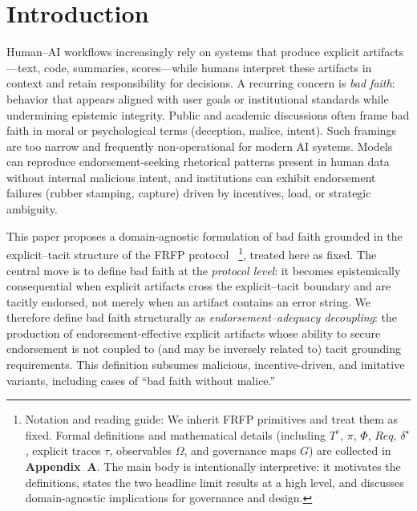 \documentclass[preprints,article,submit,pdftex,moreauthors,accept]{Definitions/mdpi}
\begin{document}
\nolinenumbers  %

\setcounter{section}{-1} %
\section{Introduction}
Human--AI workflows increasingly rely on systems that produce explicit artifacts---text, code, summaries, scores---while humans interpret these artifacts in context and retain responsibility for decisions. A recurring concern is \emph{bad faith}: behavior that appears aligned with user goals or institutional standards while undermining epistemic integrity. Public and academic discussions often frame bad faith in moral or psychological terms (deception, malice, intent). Such framings are too narrow and frequently non-operational for modern AI systems. Models can reproduce endorsement-seeking rhetorical patterns present in human data without internal malicious intent, and institutions can exhibit endorsement failures (rubber stamping, capture) driven by incentives, load, or strategic ambiguity.

This paper proposes a domain-agnostic formulation of bad faith grounded in the explicit--tacit structure of the FRFP protocol~\cite{frfpv1} \footnote{Notation and reading guide: We inherit FRFP primitives and treat them as fixed. Formal definitions and mathematical details (including \(T^e\), \(\pi\), \(\Phi\), \(Req\), \(\delta^\star\), explicit traces \(\tau\), observables \(\Omega\), and governance maps \(G\)) are collected in \textbf{Appendix~A}. The main body is intentionally interpretive: it motivates the definitions, states the two headline limit results at a high level, and discusses domain-agnostic implications for governance and design.}, treated here as fixed. The central move is to define bad faith at the \emph{protocol level}: it becomes epistemically consequential when explicit artifacts cross the explicit--tacit boundary and are tacitly endorsed, not merely when an artifact contains an error string. We therefore define bad faith structurally as \emph{endorsement--adequacy decoupling}: the production of endorsement-effective explicit artifacts whose ability to secure endorsement is not coupled to (and may be inversely related to) tacit grounding requirements. This definition subsumes malicious, incentive-driven, and imitative variants, including cases of ``bad faith without malice.''
\end{document}
